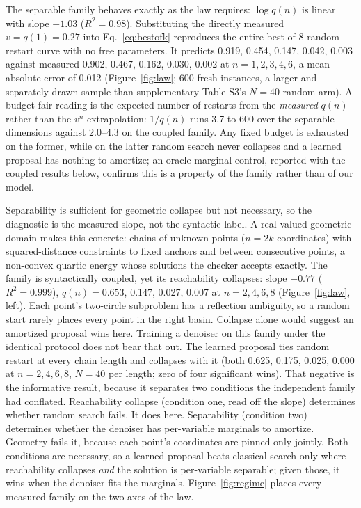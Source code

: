 \documentclass[letterpaper]{article} %
\begin{document}
The separable family behaves exactly as the law requires: $\log q(n)$ is linear with slope
$-1.03$ ($R^2 = 0.98$). Substituting the directly measured $v = q(1) = 0.27$ into
Eq.~\eqref{eq:bestofk} reproduces the entire best-of-8 random-restart curve with no free
parameters. It predicts 0.919,
0.454, 0.147, 0.042, 0.003 against measured 0.902, 0.467, 0.162, 0.030, 0.002 at
$n = 1, 2, 3, 4, 6$, a mean absolute error of 0.012
(Figure~\ref{fig:law}; 600 fresh instances, a larger and separately drawn sample than
supplementary Table S3's $N = 40$ random arm). A budget-fair
reading is the expected number of restarts from the \emph{measured} $q(n)$ rather than the
$v^{n}$ extrapolation: $1/q(n)$ runs 3.7 to 600 over the separable dimensions against
2.0--4.3 on the coupled family. Any fixed budget is exhausted on the
former, while on the latter random search never collapses and a learned proposal has
nothing to amortize; an oracle-marginal control, reported with the coupled results below,
confirms this is a property of the family rather than of our model.

Separability is sufficient for geometric collapse but not necessary, so the diagnostic is the
measured slope, not the syntactic label. A real-valued geometric domain makes this concrete:
chains of unknown points ($n = 2k$ coordinates) with squared-distance constraints to fixed
anchors and between consecutive points, a non-convex quartic energy whose solutions the
checker accepts exactly. The family is syntactically coupled, yet its reachability collapses:
slope $-0.77$ ($R^2 = 0.999$), $q(n) = 0.653$, 0.147, 0.027, 0.007 at $n = 2, 4, 6, 8$
(Figure~\ref{fig:law}, left). Each point's two-circle subproblem has a reflection
ambiguity, so a random start rarely places every point in the right basin. Collapse alone
would suggest an amortized proposal wins here. Training a denoiser on this family under the
identical protocol does not bear that out. The learned proposal ties random restart at every
chain length and collapses with it (both 0.625, 0.175, 0.025, 0.000 at $n = 2, 4, 6, 8$,
$N = 40$ per length; zero of four significant wins).
That negative is the informative result, because it separates two conditions the independent
family had conflated. Reachability collapse (condition one, read off the slope) determines
whether random search fails. It does here. Separability (condition two) determines whether the
denoiser has per-variable marginals to amortize. Geometry fails it, because each point's
coordinates are pinned only jointly. Both conditions are necessary, so a learned proposal
beats classical search only where reachability collapses \emph{and} the solution is
per-variable separable; given those, it wins when the denoiser fits the marginals.
Figure~\ref{fig:regime} places every measured family on the two axes of the law.
\end{document}
